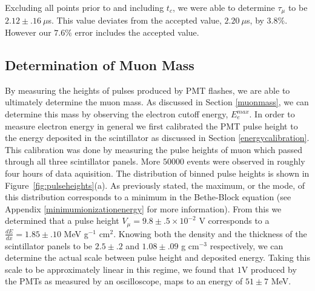 Excluding all points prior to and including $t_{c}$, we were able to determine $\tau_{\mu}$ to be $2.12 \pm .16~\mu$s.  This value deviates from the accepted value, $2.20~\mu$s, by $3.8\%$.  However our $7.6\%$ error includes the accepted value.






\subsection{Determination of Muon Mass}\label{determinationofmuonmass}

By measuring the heights of pulses produced by PMT flashes, we are
able to ultimately determine the muon mass.  As discussed in Section
\ref{muonmass}, we can determine this mass by observing the electron cutoff energy, $E_{e}^{max}$. In order to measure electron energy in general
we first calibrated the PMT pulse height to the energy deposited in
the scintillator as discussed in Section \ref{energycalibration}. This calibration
was done by measuring the pulse heights of muon which passed through
all three scintillator panels.  More $50000$ events were observed in
roughly four hours of data aquisition.  The distribution of binned
pulse heights is shown in Figure~\ref{fig:pulseheights}(a).  As previously stated, the
maximum, or the mode, of this distribution corresponds to a minimum in
the Bethe-Block equation (see Appendix \ref{minimumionizationenergy} for more information).  From this we determined that a pulse
height $V_{\mu} = 9.8\pm.5 \times 10^{-2}$ V corresponds to a $\frac{dE}{dx}= 1.85\pm.10$ MeV
g$^{-1}$ cm$^{2}$.  Knowing both the density and the thickness of the
scintillator panels to be $2.5\pm.2$ and $1.08\pm.09$ g cm$^{-3}$ respectively, we can determine
the actual scale between pulse height and deposited energy.  Taking
this scale to be approximately linear in this regime, we found that
$1$V produced by the PMTs as measured by an oscilloscope, maps to an
energy of $51 \pm 7$ MeV.



